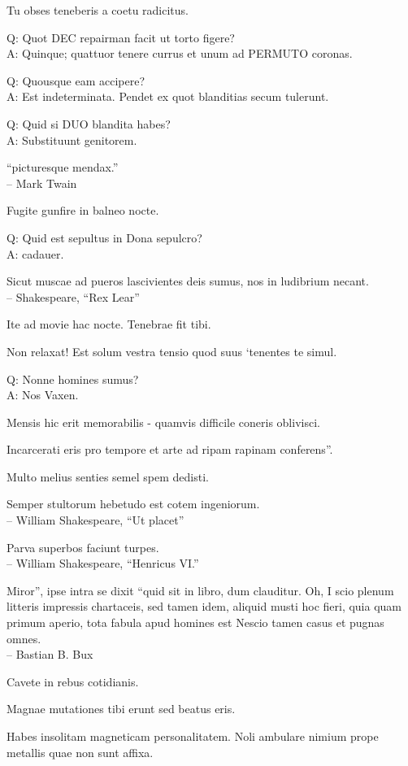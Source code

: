 \documentclass[titlepage,12pt]{memoir}
\begin{document}
Tu obses teneberis a coetu radicitus.

Q: Quot DEC repairman facit ut torto figere?\\
A: Quinque; quattuor tenere currus et unum ad PERMUTO coronas.

Q: Quousque eam accipere?\\
A: Est indeterminata.
Pendet ex quot blanditias secum tulerunt.

Q: Quid si DUO blandita habes?\\
A: Substituunt genitorem.

“picturesque mendax.”
\\-- Mark Twain

Fugite gunfire in balneo nocte.

Q: Quid est sepultus in Dona sepulcro?\\
A: cadauer.

Sicut muscae ad pueros lascivientes deis sumus, nos in ludibrium necant.
\\-- Shakespeare, “Rex Lear”

Ite ad movie hac nocte. Tenebrae fit tibi.

Non relaxat! Est solum vestra tensio quod suus ‘tenentes te simul.

Q: Nonne homines sumus?\\
A: Nos Vaxen.

Mensis hic erit memorabilis - quamvis difficile coneris oblivisci.

Incarcerati eris pro tempore et arte ad ripam rapinam conferens”.

Multo melius senties semel spem dedisti.

Semper stultorum hebetudo est cotem ingeniorum.
\\-- William Shakespeare, “Ut placet”

Parva superbos faciunt turpes.
\\-- William Shakespeare, “Henricus VI.”

Miror”, ipse intra se dixit “quid sit in libro, dum clauditur. Oh, I
scio plenum litteris impressis chartaceis, sed tamen idem, aliquid musti
hoc fieri, quia quam primum aperio, tota fabula apud homines est
Nescio tamen casus et pugnas omnes.
\\-- Bastian B. Bux

Cavete in rebus cotidianis.

Magnae mutationes tibi erunt sed beatus eris.

Habes insolitam magneticam personalitatem. Noli ambulare nimium prope
metallis quae non sunt affixa.
\end{document}
